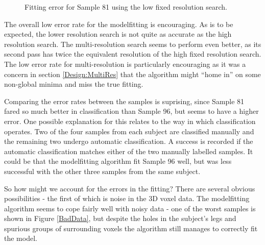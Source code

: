 \begin{figure}[p]
        \quad

        \caption{Fitting error for Sample 81 using the low fixed resolution search.}
        \label{ManualFit81:res10}
\end{figure}


The overall low error rate for the modelfitting is encouraging.
As is to be expected, the lower resolution search is not quite as accurate as the high resolution search.
The multi-resolution search seems to perform even better, as its second pass has twice the equivalent resolution of the high fixed resolution search.
The low error rate for multi-resolution is particularly encouraging as it was a concern in section \ref{Design:MultiRes} that the algorithm might ``home in'' on some non-global minima and miss the true fitting.

Comparing the error rates between the samples is suprising, since Sample 81 fared so much better in classification than Sample 96, but seems to have a higher error.
One possible explanation for this relates to the way in which classification operates.
Two of the four samples from each subject are classified manually and the remaining two undergo automatic classification.
A success is recorded if the automatic classification matches either of the two manually labelled samples.
It could be that the modelfitting algorithm fit Sample 96 well, but was less successful with the other three samples from the same subject.

\bigskip
\noindent So how might we account for the errors in the fitting?
There are several obvious possibilities - the first of which is noise in the 3D voxel data.
The modelfitting algorithm seems to cope fairly well with noisy data - one of the worst samples is shown in Figure \ref{BadData}, but despite the holes in the subject's legs and spurious groups of surrounding voxels the algorithm still manages to correctly fit the model.

